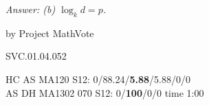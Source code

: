 
{\it Answer:  (b) $\log_k d=p$.}


\medskip
by Project MathVote

SVC.01.04.052

HC AS MA120 S12: 0/88.24/{\bf5.88}/5.88/0/0  \\
AS DH MA1302 070 S12: 0/{\bf100}/0/0 time 1:00  \\

